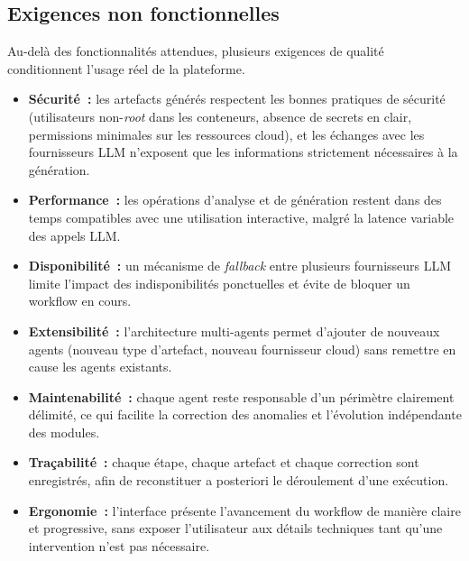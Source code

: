 \subsection{Exigences non fonctionnelles}

Au-delà des fonctionnalités attendues, plusieurs exigences de qualité conditionnent
l'usage réel de la plateforme.

\begin{itemize}
    \item \textbf{Sécurité~:} les artefacts générés respectent les bonnes pratiques de
    sécurité (utilisateurs non-\textit{root} dans les conteneurs, absence de secrets en
    clair, permissions minimales sur les ressources cloud), et les échanges avec les
    fournisseurs LLM n'exposent que les informations strictement nécessaires à la
    génération.

    \item \textbf{Performance~:} les opérations d'analyse et de génération restent dans des
    temps compatibles avec une utilisation interactive, malgré la latence variable des
    appels LLM.

    \item \textbf{Disponibilité~:} un mécanisme de \textit{fallback} entre plusieurs
    fournisseurs LLM limite l'impact des indisponibilités ponctuelles et évite de bloquer
    un workflow en cours.

    \item \textbf{Extensibilité~:} l'architecture multi-agents permet d'ajouter de nouveaux
    agents (nouveau type d'artefact, nouveau fournisseur cloud) sans remettre en cause les
    agents existants.

    \item \textbf{Maintenabilité~:} chaque agent reste responsable d'un périmètre
    clairement délimité, ce qui facilite la correction des anomalies et l'évolution
    indépendante des modules.

    \item \textbf{Traçabilité~:} chaque étape, chaque artefact et chaque correction sont
    enregistrés, afin de reconstituer a posteriori le déroulement d'une exécution.

    \item \textbf{Ergonomie~:} l'interface présente l'avancement du workflow de manière
    claire et progressive, sans exposer l'utilisateur aux détails techniques tant qu'une
    intervention n'est pas nécessaire.
\end{itemize}

